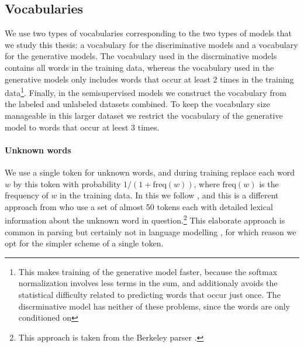 \subsection{Vocabularies}
We use two types of vocabularies corresponding to the two types of models that we study this thesis: a vocabulary for the discriminative models and a vocabulary for the generative models. The vocabulary used in the discrminative models contains all words in the training data, whereas the vocabulary used in the generative models only includes words that occur at least 2 times in the training data\footnote{This makes training of the generative model faster, because the softmax normalization involves less terms in the sum, and additionaly avoids the statistical difficulty related to predicting words that occur just once. The discrminative model has neither of these problems, since the words are only conditioned on}. Finally, in the semisupervised models we construct the vocabulary from the labeled and unlabeled datasets combined. To keep the vocabulary size manageable in this larger dataset we restrict the vocabulary of the generative model to words that occur at leest 3 times.

\paragraph{Unknown words} We use a single token for unknown words, and during training replace each word $w$ by this token with probability $1 / (1 + \text{freq}(w))$, where $\text{freq}(w)$ is the frequency of $w$ in the training data. In this we follow \citet{stern2017minimal}, and this is a different approach from \citet{dyer2016rnng} who use a set of almost 50 tokens each with detailed lexical information about the unknown word in question.\footnote{This approach is taken from the Berkeley parser \citep{petrov2006learning}.} This elaborate approach is common in parsing but certainly not in language modelling \citep{dyer2016rnng}, for which reason we opt for the simpler scheme of a single token.

